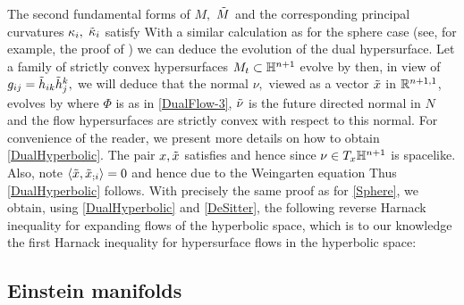 {{The second fundamental forms of $M,$ $\~M$ and the corresponding principal curvatures $\k_{i},$ $\~\k_{i}$ satisfy
} 
With a similar calculation as for the sphere case (see, for example, the proof  of \cite[Lemma~4.2]{Yu:04/2016}) we can deduce the evolution of the dual hypersurface. Let a family of strictly convex hypersurfaces $M_{t}\sub\H^{n+1}$ evolve by
then, in view of $g_{ij}=\~h_{ik}\~h^{k}_{j},$ we will deduce that the normal $\nu,$ viewed as a vector $\~x$ in $\R^{n+1,1}$, evolves by
where $\Phi$ is as in \eqref{DualFlow-3}, $\~\nu$ is the future directed normal in $N$ and the flow hypersurfaces are strictly convex with respect to this normal. For convenience of the reader, we present more details on how to obtain \eqref{DualHyperbolic}. The pair $x,\~x$ satisfies 
 and hence
 since $\nu\in T_x \H^{n+1}$ is spacelike. Also, note $\ip{\~x}{\~x_{;i}}=0$ and hence due to the Weingarten equation
 Thus \eqref{DualHyperbolic} follows.
With precisely the same proof as for \cref{Sphere}, we obtain, using \eqref{DualHyperbolic} and \cref{DeSitter}, the following reverse Harnack inequality for expanding flows of the hyperbolic space, which is to our knowledge the first Harnack inequality for hypersurface flows in the hyperbolic space:



 

\subsection*{Einstein manifolds}

}
